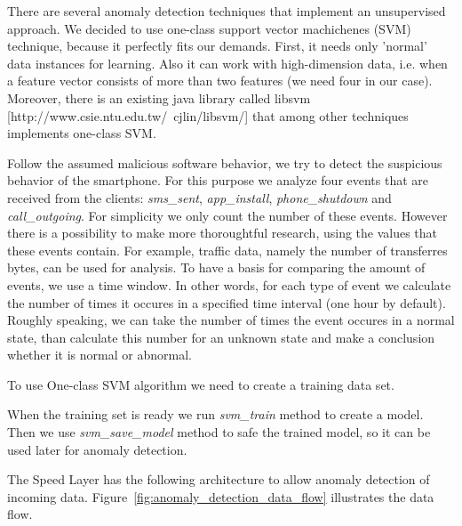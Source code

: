 There are several anomaly detection techniques that implement an unsupervised approach.
We decided to use one-class support vector machichenes (SVM) technique, because it perfectly fits our demands.
First, it needs only 'normal' data instances for learning.
Also it can work with high-dimension data, i.e. when a feature vector consists of more than two features (we need four in our case).
Moreover, there is an existing java library called libsvm [http://www.csie.ntu.edu.tw/~cjlin/libsvm/] that among other techniques implements one-class SVM.

Follow the assumed malicious software behavior, we try to detect the suspicious behavior of the smartphone.
For this purpose we analyze four events that are received from the clients: \textit{sms\_sent}, \textit{app\_install}, \textit{phone\_shutdown} and \textit{call\_outgoing}.
For simplicity we only count the number of these events.
However there is a possibility to make more thoroughtful research, using the values that these events contain.
For example, traffic data, namely the number of transferres bytes, can be used for analysis.
To have a basis for comparing the amount of events, we use a time window.
In other words, for each type of event we calculate the number of times it occures in a specified time interval (one hour by default).
Roughly speaking, we can take the number of times the event occures in a normal state, than calculate this number for an unknown state and make a conclusion whether it is normal or abnormal.

To use One-class SVM algorithm we need to create a training data set.

When the training set is ready we run \textit{svm\_train} method to create a model.
Then we use \textit{svm\_save\_model} method to safe the trained model, so it can be used later for anomaly detection.

The Speed Layer has the following architecture to allow anomaly detection of incoming data.
Figure~\ref{fig:anomaly_detection_data_flow} illustrates the data flow.

